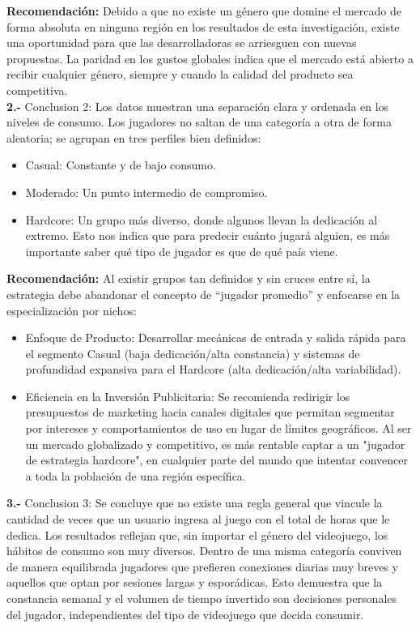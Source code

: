 \documentclass[oneside,11pt]{Latex/Classes/PhDthesisPSnPDF}
\begin{document}
\textbf{Recomendación:} Debido a que no existe un género que domine el
mercado de forma absoluta en ninguna región en los resultados de esta
investigación, existe una oportunidad para que las desarrolladoras se
arriesguen con nuevas propuestas. La paridad en los gustos globales
indica que el mercado está abierto a recibir cualquier género, siempre y
cuando la calidad del producto sea competitiva.\\

\textbf{2.-} Conclusion 2: Los datos muestran una separación clara y
ordenada en los niveles de consumo. Los jugadores no saltan de una
categoría a otra de forma aleatoria; se agrupan en tres perfiles bien
definidos:

\begin{itemize} 
  \item Casual: Constante y de bajo consumo. 
  \item Moderado: Un punto intermedio de compromiso.
  \item Hardcore: Un grupo más diverso, donde algunos llevan la dedicación al extremo. Esto nos indica que para predecir cuánto jugará alguien, es más importante saber qué tipo de jugador es que de qué país viene.
\end{itemize}

\textbf{Recomendación:} Al existir grupos tan definidos y sin cruces
entre sí, la estrategia debe abandonar el concepto de ``jugador
promedio'' y enfocarse en la especialización por nichos:

\begin{itemize} 
  \item Enfoque de Producto: Desarrollar mecánicas de entrada y salida rápida para el segmento Casual (baja dedicación/alta constancia) y sistemas de profundidad expansiva para el Hardcore (alta dedicación/alta variabilidad). 
  \item Eficiencia en la Inversión Publicitaria: Se recomienda redirigir los presupuestos de marketing hacia canales digitales que permitan segmentar por intereses y comportamientos de uso en lugar de límites geográficos. Al ser un mercado globalizado y competitivo, es más rentable captar a un "jugador de estrategia hardcore", en cualquier parte del mundo que intentar convencer a toda la población de una región específica. 
\end{itemize}

\textbf{3.-} Conclusion 3: Se concluye que no existe una regla general
que vincule la cantidad de veces que un usuario ingresa al juego con el
total de horas que le dedica. Los resultados reflejan que, sin importar
el género del videojuego, los hábitos de consumo son muy diversos.
Dentro de una misma categoría conviven de manera equilibrada jugadores
que prefieren conexiones diarias muy breves y aquellos que optan por
sesiones largas y esporádicas. Esto demuestra que la constancia semanal
y el volumen de tiempo invertido son decisiones personales del jugador,
independientes del tipo de videojuego que decida consumir.\\
\end{document}
